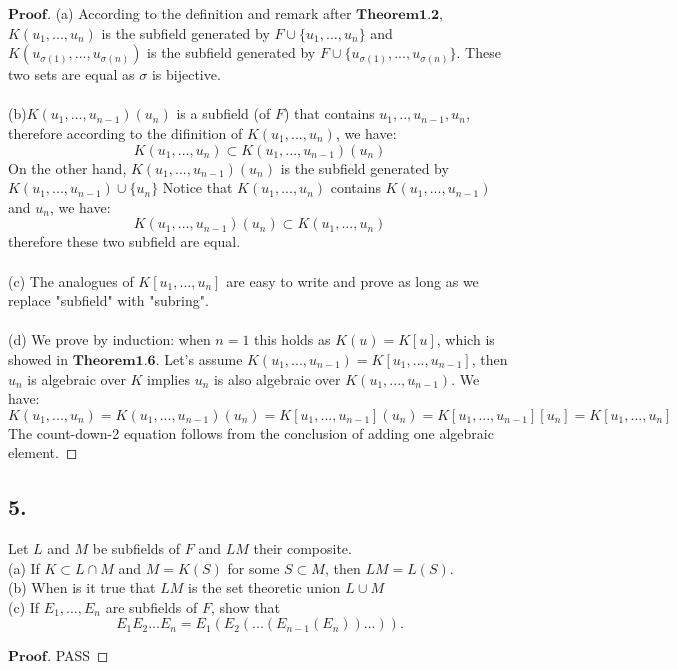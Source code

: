 \documentclass[a4paper, 11pt]{article}
\newenvironment{myprf}
{\renewcommand\qedsymbol{$ $}\begin{proof}[$\mathbf{Proof}$]}
  {\end{proof}}
\begin{document}
\begin{myprf}
        \noindent
        (a) According to the definition and remark after $\textbf{Theorem1.2}$, 
        $K(u_1,...,u_n)$ is the subfield generated by $F\cup \{u_1,...,u_n\}$ and 
        $K(u_{\sigma(1)},...,u_{\sigma(n)})$ is the subfield generated by $F\cup
        \{u_{\sigma(1)},...,u_{\sigma(n)}\}$. These two sets are equal as $\sigma$ is 
        bijective.\\
        \\
        (b)$K(u_1,...,u_{n-1})(u_n)$ is a subfield (of $F$) that contains $u_1,..,u_{n-1}
        ,u_n$, therefore according to the difinition of $K(u_1,...,u_n)$, we have:
        $$
        K(u_1,...,u_n)\subset K(u_1,...,u_{n-1})(u_n)
        $$
        On the other hand, $K(u_1,...,u_{n-1})(u_n)$ is the subfield generated by 
        $K(u_1,...,u_{n-1})\cup \{u_n\}$ Notice that $K(u_1,...,u_n)$ contains 
        $K(u_1,...,u_{n-1})$ and $u_n$, we have:
        $$
        K(u_1,...,u_{n-1})(u_n)\subset K(u_1,...,u_n)
        $$ therefore these two subfield are equal.\\
        \\
        (c) The analogues of $K[u_1,...,u_n]$ are easy to write and prove as long as 
        we replace "subfield"  with "subring".\\
        \\
        (d) We prove by induction: when $n=1$ this holds as $K(u)=K[u]$, which is showed  
        in $\textbf{Theorem1.6}$. Let's assume $K(u_1,...,u_{n-1})=K[u_1,...,u_{n-1}]$,
        then $u_n$ is algebraic over $K$ implies $u_n$ is also algebraic over
        $K(u_1,...,u_{n-1})$. We have:
        $$
        K(u_1,...,u_n)=K(u_1,...,u_{n-1})(u_n)=K[u_1,...,u_{n-1}](u_n)=K[u_1,...,u_{n-1}][u_n]=K[u_1,...,u_n]
        $$ The count-down-2 equation follows from the conclusion of adding one algebraic 
        element.
\end{myprf}

\subsection*{5.}
\noindent
Let $L$ and $M$ be subfields of $F$ and $LM$ their composite.\\
\indent (a) If $K\subset L\cap M$ and $M=K(S)$ for some $S\subset M$, then $LM=L(S)$.\\
\indent (b) When is it true that $LM$ is the set theoretic union $L\cup M$\\
\indent (c) If $E_1,...,E_n$ are subfields of $F$, show that
$$
E_{1}E_{2}...E_{n}=E_1(E_2(...(E_{n-1}(E_{n}))...)).
$$
\begin{myprf}
       PASS
\end{myprf}
        
\end{document}
